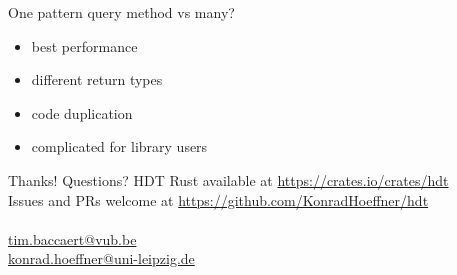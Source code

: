 \documentclass[14pt,aspectratio=169]{beamer}
\newcommand\pro{\item[$+$]}
\newcommand\con{\item[$-$]}
\begin{document}
\begin{frame}[fragile]{One pattern query method vs many?}
\begin{itemize}
\pro best performance
\con different return types
\con code duplication
\con complicated for library users
\end{itemize}
\end{frame}

\iffalse
\begin{frame}{Conclusions}
\begin{itemize}
\item Rust great fit for stable and performant Semantic Web tooling
\end{itemize}
\end{frame}
\fi

\begin{frame}[fragile]{Thanks! Questions?}
\centering
HDT Rust available at \url{https://crates.io/crates/hdt}\\
Issues and PRs welcome at \url{https://github.com/KonradHoeffner/hdt}\\
~\\
\url{tim.baccaert@vub.be}\\
\url{konrad.hoeffner@uni-leipzig.de}\\
\end{frame}
\end{document}
